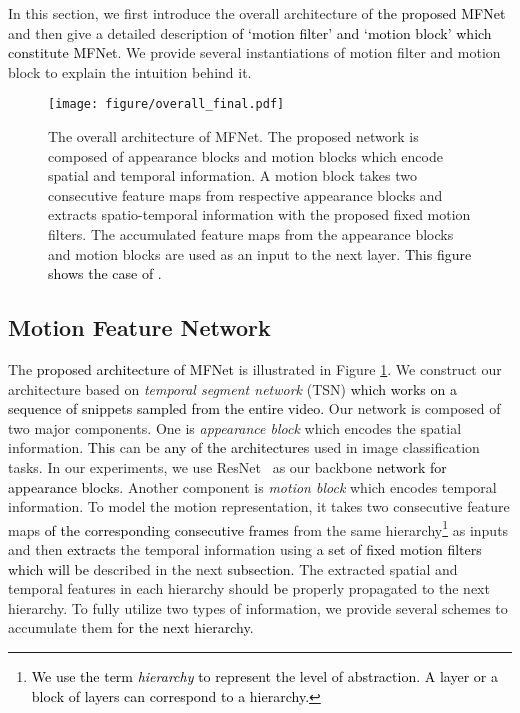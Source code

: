 \documentclass[runningheads]{llncs}
\newcommand{\nj}[1]{\textcolor{black}{#1}}
\newcommand{\mg}[1]{\textcolor{black}{#1}}
\begin{document}
In this section, we first introduce the overall architecture of \nj{the proposed MFNet} and then give a detailed description \nj{of `motion filter' and `motion block'} \nj{which constitute MFNet}. We provide several instantiations of motion filter and motion block to explain the intuition behind it. 

\begin{figure}[t]
	\centering
    \texttt{[image: figure/overall\_final.pdf]}
    \caption{The overall architecture of MFNet. The proposed network is composed of appearance blocks and motion blocks which encode spatial and temporal information. A motion block takes two consecutive feature maps from respective appearance blocks and extracts spatio-temporal information with the proposed fixed motion filters. The accumulated feature maps from the appearance blocks and motion blocks are used as an input to the next layer. \mg{This figure shows the case of .}}
    \label{fig:arch}
\end{figure}

\subsection{Motion Feature Network}

The \nj{proposed architecture of MFNet} is illustrated in Figure \ref{fig:arch}. We construct our architecture based on \textit{temporal segment network} (TSN) \cite{wang2016temporal} \mg{which works on a sequence of  snippets sampled from the entire video.} Our network is composed of two major components. One is \textit{appearance block} which encodes the spatial information. \nj{This} can be \nj{any of the architectures} used in image classification tasks. In our experiments, we use ResNet~\cite{he2016deep} as our backbone \nj{network for appearance blocks}. 
Another component is \textit{motion block} which encodes temporal information. To model the motion representation, it takes two consecutive feature maps \nj{of the corresponding consecutive frames} from the same hierarchy\footnote{\nj{We use the term \textit{hierarchy} to represent the level of abstraction. A layer or a block of layers can correspond to a hierarchy.} } as inputs and then \nj{extracts} the temporal information using \nj{a set of fixed motion filters which will be} described in the next \nj{subsection.} The extracted spatial and temporal features in each hierarchy should \nj{be} properly propagated to the next hierarchy. To fully utilize two types of information, we provide several schemes to accumulate them \nj{for the next hierarchy}.
\end{document}
